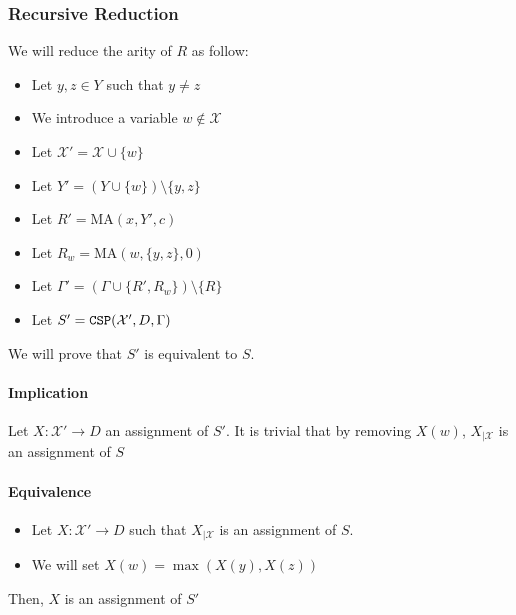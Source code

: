 \subsubsection{Recursive Reduction}
We will reduce the arity of $R$ as follow:
\begin{itemize}
	\item Let $y,z\in Y$ such that $y\ne z$
	\item We introduce a variable $w\notin \mathcal{X}$
	\item Let $\mathcal{X}'=\mathcal{X}\cup\{w\}$
	\item Let $Y'=(Y\cup \{w\})\setminus\{y,z\}$
	\item Let $R'=\text{MA}(x,Y',c)$
	\item Let $R_w=\text{MA}(w,\{y,z\},0)$
	\item Let $\Gamma'=(\Gamma\cup\{R',R_w\})\setminus \{R\}$
	\item Let $S'=\operatorname{\mathtt{CSP}}(\mathcal{X}',D,\Gamma)$
\end{itemize}


We will prove that $S'$ is equivalent to $S.$

\paragraph{Implication}
Let $X:\mathcal{X}'\rightarrow D$ an assignment of $S'.$ It is trivial that by removing $X(w)$, $X_{\mid \mathcal{X}}$ is an assignment of $S$ 

\paragraph{Equivalence}
\begin{itemize}
	\item Let $X:\mathcal{X}'\rightarrow D$ such that $X_{\mid \mathcal{X}}$ is an assignment of $S.$
	\item We will set $X(w)=\max(X(y),X(z))$
\end{itemize}
Then, $X$ is an assignment of $S'$

